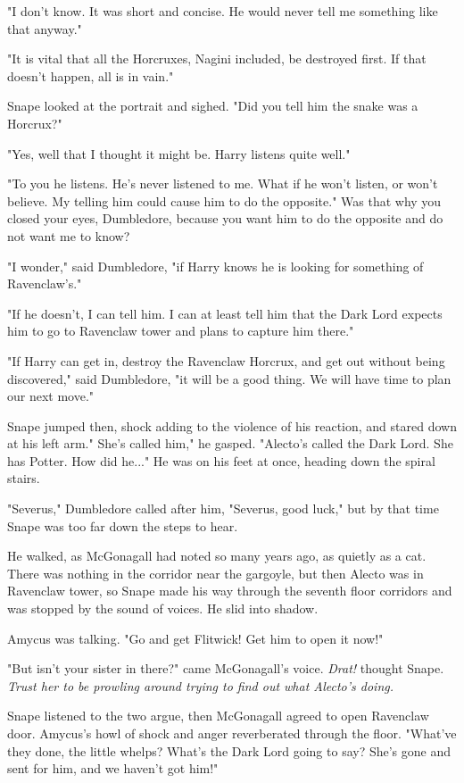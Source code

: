 \documentclass[a4paper,11pt]{article}
\begin{document}
"I don't know. It was short and concise. He would never tell me something like that anyway."

"It is vital that all the Horcruxes, Nagini included, be destroyed first. If that doesn't happen, all is in vain."

Snape looked at the portrait and sighed. "Did you tell him the snake was a Horcrux?"

"Yes, well that I thought it might be. Harry listens quite well."

"To you he listens. He's never listened to me. What if he won't listen, or won't believe. My telling him could cause him to do the opposite." Was that why you closed your eyes, Dumbledore, because you want him to do the opposite and do not want me to know?

"I wonder," said Dumbledore, "if Harry knows he is looking for something of Ravenclaw's."

"If he doesn't, I can tell him. I can at least tell him that the Dark Lord expects him to go to Ravenclaw tower and plans to capture him there."

"If Harry can get in, destroy the Ravenclaw Horcrux, and get out without being discovered," said Dumbledore, "it will be a good thing. We will have time to plan our next move."

Snape jumped then, shock adding to the violence of his reaction, and stared down at his left arm." She's called him," he gasped. "Alecto's called the Dark Lord. She has Potter. How did he..." He was on his feet at once, heading down the spiral stairs.

"Severus," Dumbledore called after him, "Severus, good luck," but by that time Snape was too far down the steps to hear.

He walked, as McGonagall had noted so many years ago, as quietly as a cat. There was nothing in the corridor near the gargoyle, but then Alecto was in Ravenclaw tower, so Snape made his way through the seventh floor corridors and was stopped by the sound of voices. He slid into shadow.

Amycus was talking. "Go and get Flitwick! Get him to open it now!"

"But isn't your sister in there?" came McGonagall's voice.\emph{ Drat!} thought Snape. \emph{Trust her to be prowling around trying to find out what Alecto's doing.}

Snape listened to the two argue, then McGonagall agreed to open Ravenclaw door. Amycus's howl of shock and anger reverberated through the floor. "What've they done, the little whelps? What's the Dark Lord going to say? She's gone and sent for him, and we haven't got him!"
\end{document}
